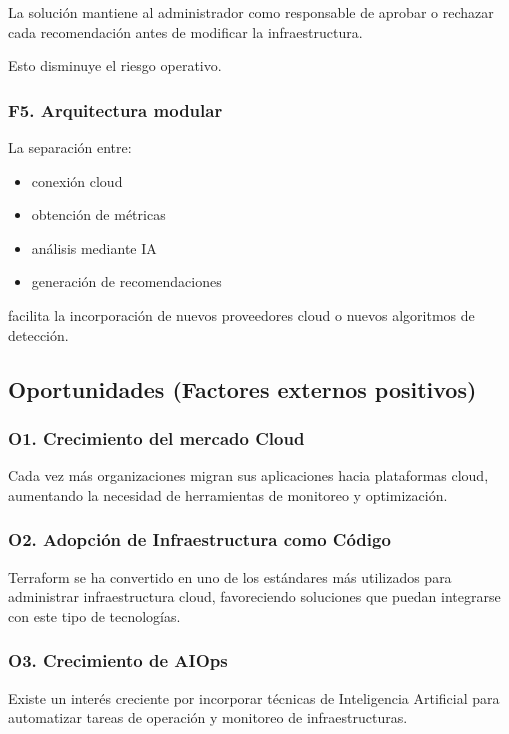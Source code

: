 La solución mantiene al administrador como responsable de aprobar o rechazar cada recomendación antes de modificar la infraestructura.

Esto disminuye el riesgo operativo.

\subsubsection*{F5. Arquitectura modular}

La separación entre:
\begin{itemize}
\item conexión cloud
\item obtención de métricas
\item análisis mediante IA
\item generación de recomendaciones
\end{itemize}

facilita la incorporación de nuevos proveedores cloud o nuevos algoritmos de detección.

\subsection{Oportunidades (Factores externos positivos)}

\subsubsection*{O1. Crecimiento del mercado Cloud}

Cada vez más organizaciones migran sus aplicaciones hacia plataformas cloud, aumentando la necesidad de herramientas de monitoreo y optimización.

\subsubsection*{O2. Adopción de Infraestructura como Código}

Terraform se ha convertido en uno de los estándares más utilizados para administrar infraestructura cloud, favoreciendo soluciones que puedan integrarse con este tipo de tecnologías.

\subsubsection*{O3. Crecimiento de AIOps}

Existe un interés creciente por incorporar técnicas de Inteligencia Artificial para automatizar tareas de operación y monitoreo de infraestructuras.

